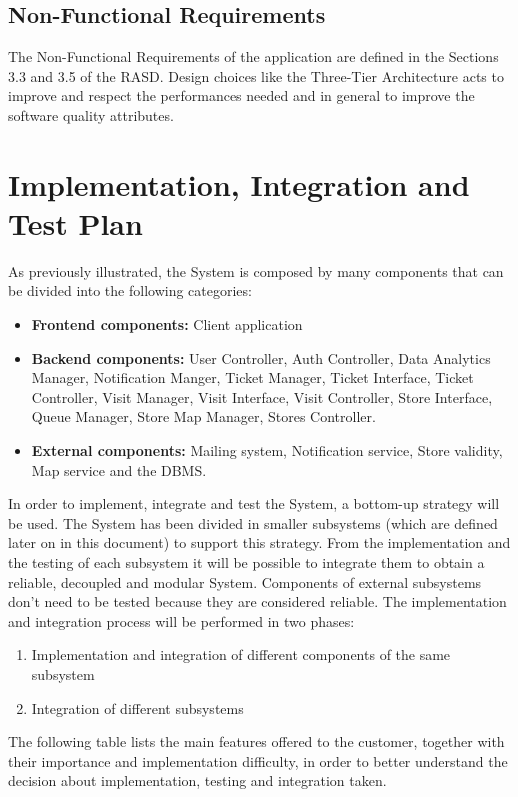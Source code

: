 \documentclass[a4paper, 12pt, oneside, table]{article}
\begin{document}
\subsection{Non-Functional Requirements}
The Non-Functional Requirements of the application are defined in the Sections 3.3 and 3.5 of the RASD. Design choices like the Three-Tier Architecture acts to improve and respect the performances needed and in general to improve the software quality attributes.
\newpage
\section{Implementation, Integration and Test Plan}

As previously illustrated, the System is composed by many components that can be divided into the following categories:
\begin{itemize}
    \item \textbf{Frontend components:} Client application
    \item \textbf{Backend components:} User Controller, Auth Controller, Data Analytics Manager, Notification Manger, Ticket Manager, Ticket Interface, Ticket Controller, Visit Manager, Visit Interface, Visit Controller, Store Interface, Queue Manager, Store Map Manager, Stores Controller.
    \item \textbf{External components:} Mailing system, Notification service, Store validity, Map service and the DBMS.
\end{itemize}

In order to implement, integrate and test the System, a bottom-up strategy will be used. The System has been divided in smaller subsystems (which are defined later on in this document) to support this strategy. From the implementation and the testing of each subsystem it will be possible to integrate them to obtain a reliable, decoupled and modular System. 
Components of external subsystems don't need to be tested because they are considered reliable.
The implementation and integration process will be performed in two phases:
\begin{enumerate}
    \item Implementation and integration of different components of the same subsystem
    \item Integration of different subsystems
\end{enumerate}
The following table lists the main features offered to the customer, together with their importance and implementation difficulty, in order to better understand the decision about implementation, testing and integration taken.
\end{document}
